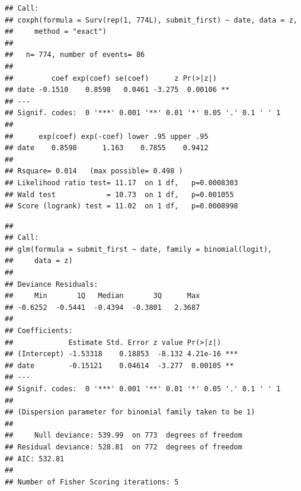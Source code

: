 \documentclass[]{article}
\newenvironment{Shaded}{\begin{snugshade}}{\end{snugshade}}
\newcommand{\KeywordTok}[1]{\textcolor[rgb]{0.13,0.29,0.53}{\textbf{#1}}}
\newcommand{\DataTypeTok}[1]{\textcolor[rgb]{0.13,0.29,0.53}{#1}}
\newcommand{\StringTok}[1]{\textcolor[rgb]{0.31,0.60,0.02}{#1}}
\newcommand{\CommentTok}[1]{\textcolor[rgb]{0.56,0.35,0.01}{\textit{#1}}}
\newcommand{\OperatorTok}[1]{\textcolor[rgb]{0.81,0.36,0.00}{\textbf{#1}}}
\newcommand{\NormalTok}[1]{#1}
\let\oldShaded\Shaded
\let\endoldShaded\endShaded
\renewenvironment{Shaded}{\footnotesize\oldShaded}{\endoldShaded}
\begin{document}
\begin{verbatim}
## Call:
## coxph(formula = Surv(rep(1, 774L), submit_first) ~ date, data = z, 
##     method = "exact")
## 
##   n= 774, number of events= 86 
## 
##         coef exp(coef) se(coef)      z Pr(>|z|)   
## date -0.1510    0.8598   0.0461 -3.275  0.00106 **
## ---
## Signif. codes:  0 '***' 0.001 '**' 0.01 '*' 0.05 '.' 0.1 ' ' 1
## 
##      exp(coef) exp(-coef) lower .95 upper .95
## date    0.8598      1.163    0.7855    0.9412
## 
## Rsquare= 0.014   (max possible= 0.498 )
## Likelihood ratio test= 11.17  on 1 df,   p=0.0008303
## Wald test            = 10.73  on 1 df,   p=0.001055
## Score (logrank) test = 11.02  on 1 df,   p=0.0008998
\end{verbatim}

\begin{Shaded}
\end{Shaded}

\begin{verbatim}
## 
## Call:
## glm(formula = submit_first ~ date, family = binomial(logit), 
##     data = z)
## 
## Deviance Residuals: 
##     Min       1Q   Median       3Q      Max  
## -0.6252  -0.5441  -0.4394  -0.3801   2.3687  
## 
## Coefficients:
##             Estimate Std. Error z value Pr(>|z|)    
## (Intercept) -1.53318    0.18853  -8.132 4.21e-16 ***
## date        -0.15121    0.04614  -3.277  0.00105 ** 
## ---
## Signif. codes:  0 '***' 0.001 '**' 0.01 '*' 0.05 '.' 0.1 ' ' 1
## 
## (Dispersion parameter for binomial family taken to be 1)
## 
##     Null deviance: 539.99  on 773  degrees of freedom
## Residual deviance: 528.81  on 772  degrees of freedom
## AIC: 532.81
## 
## Number of Fisher Scoring iterations: 5
\end{verbatim}

\begin{Shaded}
\end{Shaded}
\end{document}
